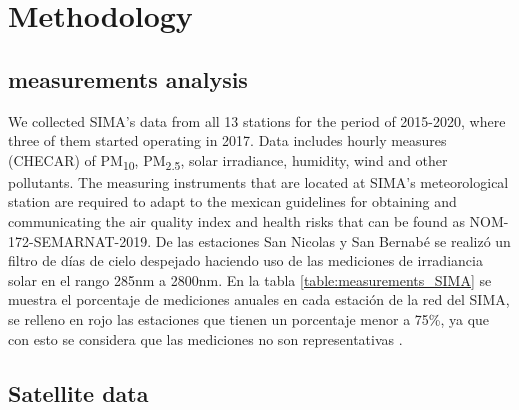 \section{Methodology}
\subsection{measurements analysis}
We collected SIMA’s data from all 13 stations for the period of 2015-2020, where three of them
started operating in 2017. Data includes hourly measures (CHECAR) of PM\textsubscript{10}, PM\textsubscript{2.5},
solar irradiance, humidity, wind and other pollutants. The measuring instruments that are located at SIMA’s
meteorological station are required to adapt to the mexican guidelines for obtaining and communicating the
air quality index and health risks that can be found as NOM-172-SEMARNAT-2019. De las estaciones San Nicolas
y San Bernabé se realizó un filtro de días de cielo despejado haciendo uso de las mediciones de irradiancia
solar en el rango 285nm a 2800nm. En la tabla \ref{table:measurements_SIMA} se muestra el porcentaje de mediciones anuales en cada estación de la red 
del SIMA, se relleno en rojo las estaciones que tienen un porcentaje menor a 75\%, ya que con esto se considera que
las mediciones no son representativas \cite{molina2019}.

\subsection{Satellite data}
